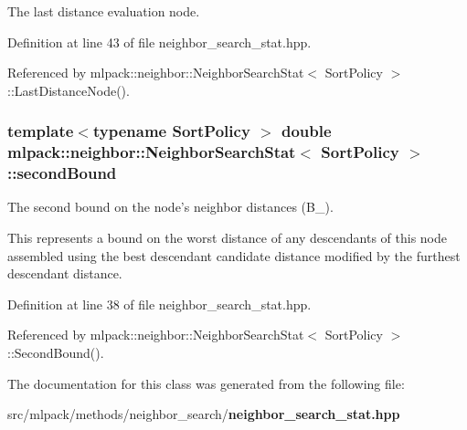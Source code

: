 The last distance evaluation node. 



Definition at line 43 of file neighbor\-\_\-search\-\_\-stat.\-hpp.



Referenced by mlpack\-::neighbor\-::\-Neighbor\-Search\-Stat$<$ Sort\-Policy $>$\-::\-Last\-Distance\-Node().

\subsubsection[{second\-Bound}]{\setlength{\rightskip}{0pt plus 5cm}template$<$typename Sort\-Policy $>$ double {\bf mlpack\-::neighbor\-::\-Neighbor\-Search\-Stat}$<$ Sort\-Policy $>$\-::second\-Bound\hspace{0.3cm}{\ttfamily [private]}}\label{classmlpack_1_1neighbor_1_1NeighborSearchStat_a42c403ceeff0a2bbc4c386924c8dcf05}


The second bound on the node's neighbor distances (B\-\_). 

This represents a bound on the worst distance of any descendants of this node assembled using the best descendant candidate distance modified by the furthest descendant distance. 

Definition at line 38 of file neighbor\-\_\-search\-\_\-stat.\-hpp.



Referenced by mlpack\-::neighbor\-::\-Neighbor\-Search\-Stat$<$ Sort\-Policy $>$\-::\-Second\-Bound().



The documentation for this class was generated from the following file\-:\begin{DoxyCompactItemize}
\item 
src/mlpack/methods/neighbor\-\_\-search/{\bf neighbor\-\_\-search\-\_\-stat.\-hpp}\end{DoxyCompactItemize}

